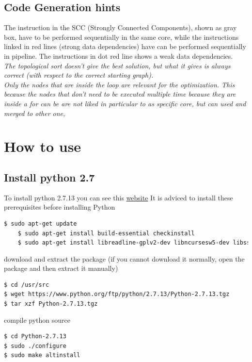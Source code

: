 {  \subsection{Code Generation hints}
The instruction in the SCC (Strongly Connected Components), shown as gray box, have to be performed sequentially in the same core, while the instructions linked in red lines (strong data dependencies) have can be performed sequentially in pipeline. The instructions in dot red line shows a weak data dependencies.\\


\textit{The topological sort doesn't give the best solution, but what it gives is always correct (with respect to the correct starting graph).} \\

\textit{ Only the nodes that are inside the loop are relevant for the optimization. This because the nodes that don't need to be executed multiple time because they are inside a for can be are not liked in particular to as specific core, but can used and merged to other one, }

\section{How to use}
\subsection{Install python 2.7}
To install python 2.7.13 you can see this  \href{https://tecadmin.net/install-python-2-7-on-ubuntu-and-linuxmint/#}{website}
It is adviced to install these prerequisites before installing Python
\begin{lstlisting}[language=bash]
	$ sudo apt-get update
	$ sudo apt-get install build-essential checkinstall
	$ sudo apt-get install libreadline-gplv2-dev libncursesw5-dev libssl-dev libsqlite3-dev tk-dev libgdbm-dev libc6-dev libbz2-dev
\end{lstlisting}


download and extract the package (if you cannot download it normally, open the package and then extract it manually)
\begin{lstlisting}[language=bash]
$ cd /usr/src
$ wget https://www.python.org/ftp/python/2.7.13/Python-2.7.13.tgz
$ tar xzf Python-2.7.13.tgz
\end{lstlisting}



compile python source
\begin{lstlisting}[language=bash]
$ cd Python-2.7.13
$ sudo ./configure
$ sudo make altinstall
\end{lstlisting}

}
